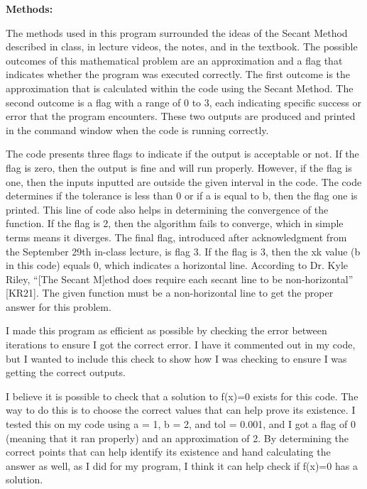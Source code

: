 \documentclass{article}
\begin{document}
{\bf Methods:} {\color{black} 
The methods used in this program surrounded the ideas of the Secant Method described in class, in lecture videos, the notes, and in the textbook.  The possible outcomes of this mathematical problem are an approximation and a flag that indicates whether the program was executed correctly.  The first outcome is the approximation that is calculated within the code using the Secant Method.  The second outcome is a flag with a range of 0 to 3, each indicating specific success or error that the program encounters.  These two outputs are produced and printed in the command window when the code is running correctly.
\par \medskip
The code presents three flags to indicate if the output is acceptable or not.  If the flag is zero, then the output is fine and will run properly.  However, if the flag is one, then the inputs inputted are outside the given interval in the code.  The code determines if the tolerance is less than 0 or if a is equal to b, then the flag one is printed.  This line of code also helps in determining the convergence of the function.  If the flag is 2, then the algorithm fails to converge, which in simple terms means it diverges.  The final flag, introduced after acknowledgment from the September 29th in-class lecture, is flag 3.  If the flag is 3, then the xk value (b in this code) equals 0, which indicates a horizontal line.  According to Dr. Kyle Riley, “[The Secant M]ethod does require each secant line to be non-horizontal” [KR21].  The given function must be a non-horizontal line to get the proper answer for this problem.
\par \medskip
I made this program as efficient as possible by checking the error between iterations to ensure I got the correct error.  I have it commented out in my code, but I wanted to include this check to show how I was checking to ensure I was getting the correct outputs.  
\par \medskip
I believe it is possible to check that a solution to f(x)=0 exists for this code.  The way to do this is to choose the correct values that can help prove its existence.  I tested this on my code using a = 1, b = 2, and tol = 0.001, and I got a flag of 0 (meaning that it ran properly) and an approximation of 2.  By determining the correct points that can help identify its existence and hand calculating the answer as well, as I did for my program, I think it can help check if f(x)=0 has a solution. 
\par \medskip
}
\end{document}
